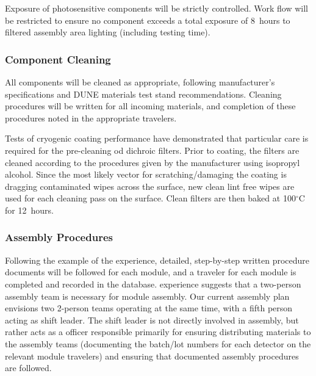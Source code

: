 
Exposure of photosensitive components will be strictly controlled.  Work flow will be restricted to ensure no component exceeds a total exposure of \SI{8}{hours} to filtered assembly area lighting (including testing time).

\subsubsection{Component Cleaning}

All components will be cleaned  as appropriate, following manufacturer's specifications and DUNE materials test stand recommendations.  Cleaning procedures will be written for all incoming materials, and completion of these procedures noted in the appropriate travelers.

Tests of cryogenic coating performance have demonstrated that particular care is required for the pre-cleaning od dichroic filters.  Prior to coating, the filters are cleaned according to the procedures given by the manufacturer using isopropyl alcohol. Since the most likely vector for scratching/damaging the coating is dragging contaminated wipes across the surface, new clean lint free wipes are used for each  cleaning pass on the surface. Clean filters are then baked at 100$^\circ$C for \SI{12}{hours}. 


\subsubsection{Assembly Procedures}

Following the example of the  experience, detailed, step-by-step written procedure documents will be followed for each module, and a  traveler for each module is completed and recorded in the database.   experience suggests that a two-person assembly team is necessary for module assembly. 
Our current assembly plan envisions two 2-person teams operating at the same time, with a fifth person acting as shift leader.  The shift leader is not directly involved in assembly, but rather acts as a  officer responsible primarily for ensuring distributing materials to the assembly teams (documenting the batch/lot numbers for each detector on the relevant module travelers) and ensuring that documented assembly procedures are followed.

